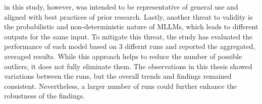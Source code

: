 in this study, however, was intended to be representative of 
general use and aligned with best practices of prior research.\newline 
Lastly, another threat to validity is the probabilistic and 
non-deterministic nature of MLLMs, which leads to different 
outputs for the same input. To mitigate this threat, the 
study has evaluated the performance of each model 
based on 3 differnt runs and reported the aggregated, 
averaged results. While this approach helps to reduce the 
number of possible outliers, it does not fully eliminate 
them. The observations in this thesis showed variations 
between the runs, but the overall trends and findings 
remained consistent. Nevertheless, a larger number of 
runs could further enhance the robustness of the findings.
